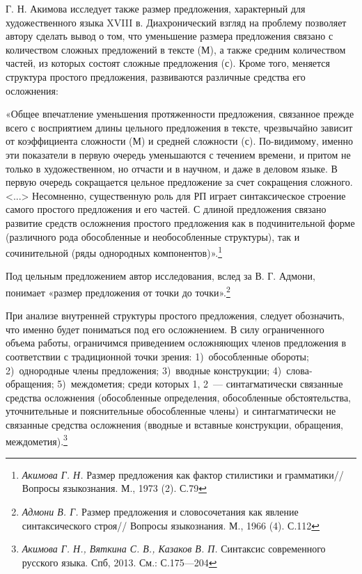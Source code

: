 \documentclass{kursa4}
\begin{document}
      Г. Н. Акимова исследует также размер предложения, характерный для
      художественного языка XVIII в. Диахронический взгляд на проблему
      позволяет автору сделать вывод о том, что уменьшение размера
      предложения связано с количеством сложных предложений в тексте (М), а
      также средним количеством частей, из которых состоят сложные
      предложения (с). Кроме того, меняется структура простого предложения,
      развиваются различные средства его осложнения:

      «Общее впечатление уменьшения протяженности предложения, связанное
      прежде всего с восприятием длины цельного предложения в тексте,
      чрезвычайно зависит от коэффициента сложности (М) и средней сложности
      (с). По-видимому, именно эти показатели в первую очередь уменьшаются с
      течением времени, и притом не только в художественном, но отчасти и в
      научном, и даже в деловом языке. В первую очередь сокращается цельное
      предложение за счет сокращения сложного. \textless{}...\textgreater{}
      Несомненно, существенную роль для РП играет синтаксическое строение
      самого простого предложения и его частей. С длиной предложения связано
      развитие средств осложнения простого предложения как в подчинительной
      форме (различного рода обособленные и необособленные структуры), так и
      сочинительной (ряды однородных
      компонентов)».\footnote{\textit{{ Акимова Г. Н.
      }}{Размер предложения как фактор стилистики и
      грамматики// Вопросы языкознания. М., 1973 (2). С.79}} 

      Под цельным предложением автор исследования, вслед за В. Г. Адмони,
      понимает «размер предложения от точки до
      точки».\footnote{\textit{{ Адмони В.
      Г.}}{ Размер предложения и словосочетания как явление
      синтаксического строя// Вопросы языкознания. М., 1966 (4). С.112}}

      При анализе внутренней структуры простого предложения, следует
      обозначить, что именно будет пониматься под его осложнением. В силу
      ограниченного объема работы, ограничимся приведением осложняющих членов
      предложения в соответствии с традиционной точки зрения: 1)~обособленные
      обороты; 2)~однородные члены предложения; 3)~вводные конструкции;
      4)~слова-обращения; 5)~междометия; среди которых 1, 2~--- синтагматически
      связанные средства осложнения (обособленные определения, обособленные
      обстоятельства, уточнительные и пояснительные обособленные члены)~и
      синтагматически не связанные средства осложнения (вводные и вставные
      конструкции, обращения, междометия).\footnote{\textit{Акимова Г. Н.,
      Вяткина С. В., Казаков В. П. }Синтаксис современного русского языка.
      Спб, 2013. См.: С.175—204} 
\end{document}
